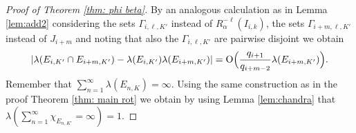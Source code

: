 \documentclass[11pt]{amsart}
\theoremstyle{definition}
\numberwithin{equation}{section}
\begin{document}
\begin{proof}[Proof of Theorem \ref{thm: phi beta}]
By an analogous calculation as in Lemma \ref{lem:add2} considering the sets $\Gamma_{i,\ell,K'}$ instead of $R_{\alpha}^{-\ell}(I_{i,k})$, the sets $\Gamma_{i+m,\ell,K'}$ instead of $J_{i+m}$ and noting that also the $\Gamma_{i,\ell,K'}$ are pairwise disjoint
we obtain 
$$
|\lambda(E_{i,K'}\cap E_{i+m,K'})- \lambda(E_{i,K'})\lambda(E_{i+m,K'})|={\rm O}\Big(\frac{q_{i+1}}{q_{i+m-2}}\lambda(E_{i+m,K'})\Big).
$$
Remember that $\sum_{n=1}^{\infty}\lambda(E_{n,K})=\infty$.
Using the same construction as in the proof Theorem \ref{thm: main rot} 
we obtain by using  Lemma \ref{lem:chandra} that $\lambda(\sum_{n=1}^{\infty}\chi_{E_{n,K'}}=\infty)=1$.
\end{proof}
\end{document}

